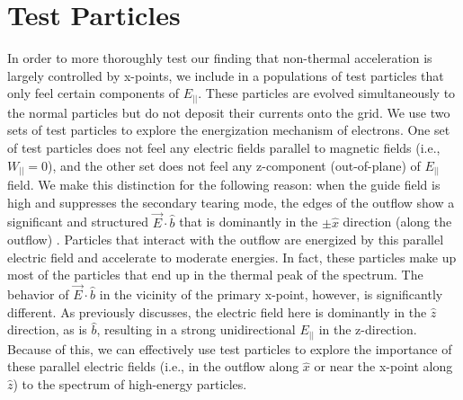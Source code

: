 \documentclass[iop,twocolappendix]{emulateapj}
\begin{document}


\section{Test Particles}
In order to more thoroughly test our finding that non-thermal acceleration is largely controlled by x-points, we include in a populations of test particles that only feel certain components of $E_{||}$.  These particles are evolved simultaneously to the normal particles but do not deposit their currents onto the grid.  We use two sets of test particles to explore the energization mechanism of electrons.  One set of test particles does not feel any electric fields parallel to magnetic fields (i.e., $W_{||}=0$), and the other set does not feel any z-component (out-of-plane) of $E_{||}$ field.  We make this distinction for the following reason: when the guide field is high and suppresses the secondary tearing mode, the edges of the outflow show a significant and structured $\vec{E}\cdot\hat{b}$ that is dominantly in the $\pm \hat{x}$ direction (along the outflow) .  Particles that interact with the outflow are energized by this parallel electric field and accelerate to moderate energies.  In fact, these particles make up most of the particles that end up in the thermal peak of the spectrum.  The behavior of $\vec{E}\cdot\hat{b}$ in the vicinity of the primary x-point, however, is significantly different.  As previously discusses, the electric field here is dominantly in the $\hat{z}$ direction, as is $\hat{b}$, resulting in a strong unidirectional $E_{||}$ in the z-direction.  Because of this, we can effectively use test particles to explore the importance of these parallel electric fields (i.e., in the outflow along $\hat{x}$ or near the x-point along $\hat{z}$) to the spectrum of high-energy particles.
\end{document}
